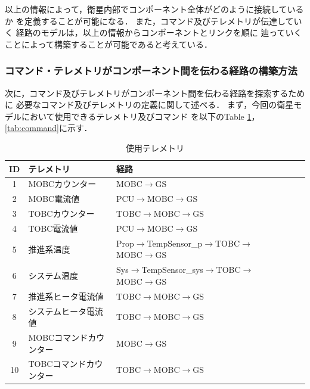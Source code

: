 \documentclass[11pt]{article}
\begin{document}
以上の情報によって，衛星内部でコンポーネント全体がどのように接続しているか
を定義することが可能になる．
また，コマンド及びテレメトリが伝達していく
経路のモデルは，以上の情報からコンポーネントとリンクを順に
辿っていくことによって構築することが可能であると考えている．

\subsubsection{コマンド・テレメトリがコンポーネント間を伝わる経路の構築方法}
次に，コマンド及びテレメトリがコンポーネント間を伝わる経路を探索するために
必要なコマンド及びテレメトリの定義に関して述べる．
まず，今回の衛星モデルにおいて使用できるテレメトリ及びコマンド
を以下のTable \ref{tab:telemetry}，\ref{tab:command}に示す．

\begin{table}[H]
   \centering
   \caption{使用テレメトリ}
   \label{tab:telemetry}
      \begin{tabular}{cllcccc} \hline
         ID&テレメトリ&経路\\ \hline
         1&MOBCカウンター&MOBC$\rightarrow$GS\\
         2&MOBC電流値&PCU$\rightarrow$MOBC$\rightarrow$GS\\
         3&TOBCカウンター&TOBC$\rightarrow$MOBC$\rightarrow$GS\\
         4&TOBC電流値&PCU$\rightarrow$MOBC$\rightarrow$GS\\
         5&推進系温度&Prop$\rightarrow$TempSensor\_p$\rightarrow$TOBC$\rightarrow$MOBC$\rightarrow$GS\\
         6&システム温度&Sys$\rightarrow$TempSensor\_sys$\rightarrow$TOBC$\rightarrow$MOBC$\rightarrow$GS\\
         7&推進系ヒータ電流値&TOBC$\rightarrow$MOBC$\rightarrow$GS\\
         8&システムヒータ電流値&TOBC$\rightarrow$MOBC$\rightarrow$GS\\
         9&MOBCコマンドカウンター&MOBC$\rightarrow$GS\\
         10&TOBCコマンドカウンター&TOBC$\rightarrow$MOBC$\rightarrow$GS\\ \hline
      \end{tabular}
\end{table}
\end{document}
